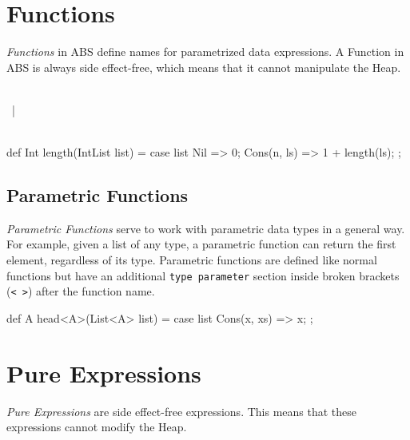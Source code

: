 




\section{Functions}
\emph{Functions} in ABS define names for parametrized data expressions.
A Function in ABS is always side effect-free, which means that it cannot
manipulate the Heap.

\begin{abssyntax}
  {}\ \ \ \ \TRS{(}  \TRS{)}\ \TRS{=}\ 
                 \ \TRS{;}  \\
\NT{FunBody}       {} ~|~ \\
   \defn {}\ 
\end{abssyntax}

\begin{absexample}
def Int length(IntList list) =
  case list { 
    Nil => 0;
    Cons(n, ls) => 1 + length(ls);
  };
\end{absexample}

\subsection{Parametric Functions}
\label{sec:parametric-functions}

\emph{Parametric Functions} serve to work with parametric data types in a
general way.  For example, given a list of any type, a parametric
function \absinline{head} can return the first element, regardless of its
type.  Parametric functions are defined like normal functions but have
an additional \texttt{type parameter} section inside broken brackets
(\texttt{< >}) after the function name.

\begin{absexample}
def A head<A>(List<A> list) =
  case list {
    Cons(x, xs) => x;
  };
\end{absexample}




\section{Pure Expressions}
\emph{Pure Expressions} are side effect-free expressions. This means that these expressions cannot modify the Heap.

